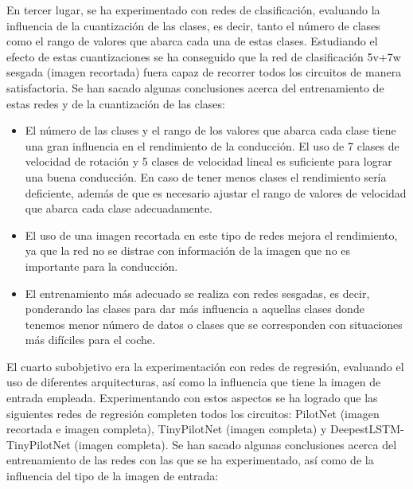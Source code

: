 En tercer lugar, se ha experimentado con redes de clasificación, evaluando la influencia de la cuantización de las clases, es decir, tanto el número de clases como el rango de valores que abarca cada una de estas clases. Estudiando el efecto de estas cuantizaciones se ha conseguido que la red de clasificación 5v+7w sesgada (imagen recortada) fuera capaz de recorrer todos los circuitos de manera satisfactoria. Se han sacado algunas conclusiones acerca del entrenamiento de estas redes y de la cuantización de las clases:\\

\begin{itemize}
    \item El número de las clases y el rango de los valores que abarca cada clase tiene una gran influencia en el rendimiento de la conducción. El uso de 7 clases de velocidad de rotación y 5 clases de velocidad lineal es suficiente para lograr una buena conducción. En caso de tener menos clases el rendimiento sería deficiente, además de que es necesario ajustar el rango de valores de velocidad que abarca cada clase adecuadamente.
    
    \item El uso de una imagen recortada en este tipo de redes mejora el rendimiento, ya que la red no se distrae con información de la imagen que no es importante para la conducción.
    
    \item El entrenamiento más adecuado se realiza con redes sesgadas, es decir, ponderando las clases para dar más influencia a aquellas clases donde tenemos menor número de datos o clases que se corresponden con situaciones más difíciles para el coche.
\end{itemize}

El cuarto subobjetivo era la experimentación con redes de regresión, evaluando el uso de diferentes arquitecturas, así como la influencia que tiene la imagen de entrada empleada. Experimentando con estos aspectos se ha logrado que las siguientes redes de regresión completen todos los circuitos: PilotNet (imagen recortada e imagen completa), TinyPilotNet (imagen completa) y DeepestLSTM-TinyPilotNet (imagen completa). Se han sacado algunas conclusiones acerca del entrenamiento de las redes con las que se ha experimentado, así como de la influencia del tipo de la imagen de entrada:\\

